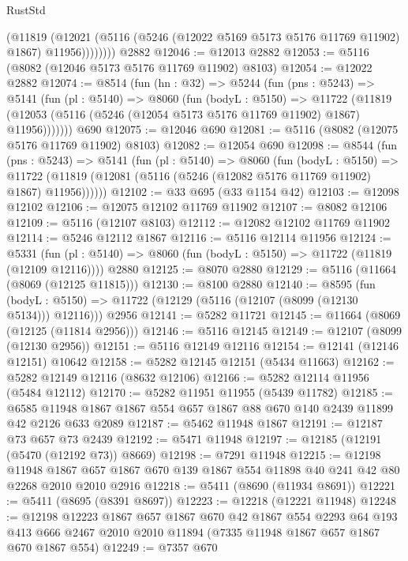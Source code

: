 \begin{lexlean}{RustStd}
\begin{coremodule}
              (@11819
                (@12021 (@5116 (@5246 (@12022 @5169 @5173 @5176 @11769 @11902) @1867) @11956))))))))
    @2882
@12046 := @12013 @2882
@12053 := @5116 (@8082 (@12046 @5173 @5176 @11769 @11902) @8103)
@12054 := @12022 @2882
@12074 := @8514
    (fun (hn : @32) =>
    @5244
      (fun (pns : @5243) =>
      @5141
        (fun (pl : @5140) =>
        @8060
          (fun (bodyL : @5150) =>
          @11722
            (@11819 (@12053 (@5116 (@5246 (@12054 @5173 @5176 @11769 @11902) @1867) @11956)))))))
    @690
@12075 := @12046 @690
@12081 := @5116 (@8082 (@12075 @5176 @11769 @11902) @8103)
@12082 := @12054 @690
@12098 := @8544
    (fun (pns : @5243) =>
    @5141
      (fun (pl : @5140) =>
      @8060
        (fun (bodyL : @5150) =>
        @11722 (@11819 (@12081 (@5116 (@5246 (@12082 @5176 @11769 @11902) @1867) @11956))))))
@12102 := @33 @695 (@33 @1154 @42)
@12103 := @12098 @12102
@12106 := @12075 @12102 @11769 @11902
@12107 := @8082 @12106
@12109 := @5116 (@12107 @8103)
@12112 := @12082 @12102 @11769 @11902
@12114 := @5246 @12112 @1867
@12116 := @5116 @12114 @11956
@12124 := @5331
    (fun (pl : @5140) => @8060 (fun (bodyL : @5150) => @11722 (@11819 (@12109 @12116))))
    @2880
@12125 := @8070 @2880
@12129 := @5116 (@11664 (@8069 (@12125 @11815)))
@12130 := @8100 @2880
@12140 := @8595
    (fun (bodyL : @5150) => @11722 (@12129 (@5116 (@12107 (@8099 (@12130 @5134))) @12116)))
    @2956
@12141 := @5282 @11721
@12145 := @11664 (@8069 (@12125 (@11814 @2956)))
@12146 := @5116 @12145
@12149 := @12107 (@8099 (@12130 @2956))
@12151 := @5116 @12149 @12116
@12154 := @12141 (@12146 @12151) @10642
@12158 := @5282 @12145 @12151 (@5434 @11663)
@12162 := @5282 @12149 @12116 (@8632 @12106)
@12166 := @5282 @12114 @11956 (@5484 @12112)
@12170 := @5282 @11951 @11955 (@5439 @11782)
@12185 := @6585 @11948 @1867 @1867 @554 @657 @1867 @88 @670 @140 @2439 @11899 @42 @2126 @633 @2089
@12187 := @5462 @11948 @1867
@12191 := @12187 @73 @657 @73 @2439
@12192 := @5471 @11948
@12197 := @12185 (@12191 (@5470 (@12192 @73)) @8669)
@12198 := @7291 @11948
@12215 := @12198
    @11948
    @1867
    @657
    @1867
    @670
    @139
    @1867
    @554
    @11898
    @40
    @241
    @42
    @80
    @2268
    @2010
    @2010
    @2916
@12218 := @5411 (@8690 (@11934 @8691))
@12221 := @5411 (@8695 (@8391 @8697))
@12223 := @12218 (@12221 @11948)
@12248 := @12198
    @12223
    @1867
    @657
    @1867
    @670
    @42
    @1867
    @554
    @2293
    @64
    @193
    @413
    @666
    @2467
    @2010
    @2010
    @11894
    (@7335 @11948 @1867 @657 @1867 @670 @1867 @554)
@12249 := @7357 @670

\end{coremodule}
\end{lexlean}
